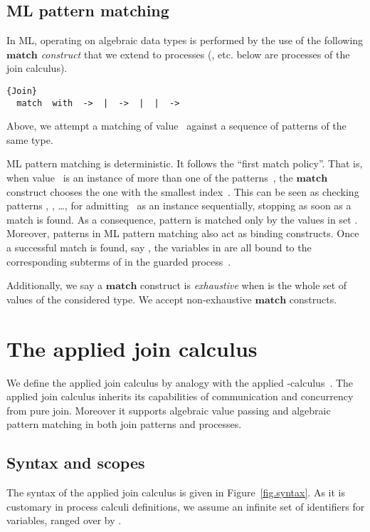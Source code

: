\documentclass{LMCS}
\newcommand{\kwd}[1]{\ensuremath{\mathbf{#1}}}
\renewcommand{\_}{\mathord{\rule[-.25ex]{1ex}{.15ex}}}
\begin{document}
\subsection{ML pattern matching}
\label{subsec.MLpt}

In ML, operating on algebraic data types is performed by the use of
the following \emph{\kwd{match} construct}
that we extend to processes (,  etc. below are processes of
the join calculus).
\begin{lstlisting}{Join}
  match  with  ->  |  ->  |  |  -> 
\end{lstlisting}
Above, we attempt a matching of value~ against a sequence of patterns
 of the same type. 

ML pattern matching is deterministic. It follows the ``first match
policy''. That is, when value~ is an instance of more than one of
the patterns~, the \kwd{match} construct chooses the one with
the smallest index~.  This can be seen as checking patterns
, , \ldots ,  for admitting~ as an instance
sequentially, stopping as soon as a match is found.  As a consequence,
pattern  is matched only by the values in set
.
Moreover, patterns in ML pattern matching also act as binding
constructs.  Once a successful match is found, say ,
the variables in  are all bound to the corresponding subterms
of  in the guarded process~.

Additionally, we say a \kwd{match} construct is \emph{exhaustive}
when  is the whole set of values of the considered type.
We accept non-exhaustive \kwd{match} constructs.


\section{The applied join calculus}
\label{sec.joinpi}

We define the applied join calculus by analogy with the applied
-calculus~\cite{AppliedPi}. The applied join calculus inherits
its capabilities of communication and concurrency from pure join.
Moreover it supports algebraic value passing and algebraic pattern
matching in both join patterns and processes.

\subsection{Syntax and scopes}
\label{subsec.syntax}

The syntax of the applied join calculus is given in
Figure~\ref{fig.syntax}. As it is customary in process calculi
definitions, we assume an infinite set of
identifiers for variables, ranged over by .
\end{document}
